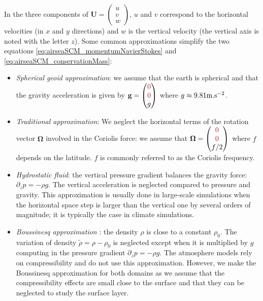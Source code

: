 In the three components of
$\mathbf{U} = \begin{pmatrix}u\\v\\w\end{pmatrix}$, $u$ and $v$
correspond to the horizontal velocities (in $x$ and $y$ directions)
and $w$ is the vertical velocity (the vertical axis is noted
with the letter $z$).
Some common approximations simplify the two equations
\eqref{eq:airseaSCM_momentumNavierStokes} and
\eqref{eq:airseaSCM_conservationMass}:
\begin{itemize}
\item \textit{Spherical geoid approximation}:
we assume that the earth is spherical and that the
gravity acceleration is given by
$\mathbf{g} =\begin{pmatrix}
	\emphase{0}\\ \emphase{0} \\ g
\end{pmatrix}$ where $g\approx 9.81 {\rm m}.{\rm s}^{-2}$.
\item \textit{Traditional approximation}:
We neglect the horizontal terms of
the rotation vector $\mathbf{\Omega}$
involved in the Coriolis force: we assume that
$\mathbf{\Omega} =\begin{pmatrix}
	\emphase{0}\\ \emphase{0} \\ f/2
\end{pmatrix}$ where $f$ depends on the latitude.
$f$ is commonly referred to as the Coriolis frequency.
\item \textit{Hydrostatic fluid}:
the vertical pressure gradient balances the gravity force:
$\partial_z p = -\rho g$. The vertical
acceleration is neglected compared to pressure and gravity.
This approximation is usually done in large-scale simulations
when the horizontal
space step is larger than the vertical one by several orders
of magnitude; it is typically the case in climate simulations.
\item \textit{Boussinesq approximation}
\citep{boussinesq_theorie_1903}:
the density $\rho$ is close to a constant $\rho_0$.
The variation of density $\widetilde{\rho} =
\rho - \rho_0$ is neglected except when it is multiplied by $g$
computing in the pressure gradient $\partial_z p = - \rho g$.
The atmosphere models rely on compressibility and
do not use this approximation. However, we make
the Boussinesq approximation for both domains
as we assume that the compressibility effects
are small close to the surface and that they
can be neglected to study the surface layer.
\end{itemize}
